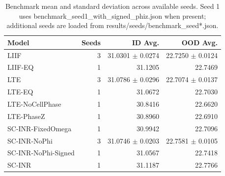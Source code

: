 \begin{table}[t]
\centering
\caption{Benchmark mean and standard deviation across available seeds. Seed 1 uses benchmark_seed1_with_signed_phiz.json when present; additional seeds are loaded from results/seeds/benchmark_seed*.json.}
\label{tab:benchmark_seed_mean_std}
\begin{tabular}{lrrr}
\toprule
Model & Seeds & ID Avg. & OOD Avg. \\
\midrule
LIIF & 3 & 31.0301 $\pm$ 0.0274 & 22.7250 $\pm$ 0.0124 \\
LIIF-EQ & 1 & 31.1205 & 22.7469 \\
LTE & 3 & 31.0786 $\pm$ 0.0296 & 22.7074 $\pm$ 0.0137 \\
LTE-EQ & 1 & 31.0672 & 22.7030 \\
LTE-NoCellPhase & 1 & 30.8416 & 22.6620 \\
LTE-PhaseZ & 1 & 30.8960 & 22.6910 \\
SC-INR-FixedOmega & 1 & 30.9942 & 22.7096 \\
SC-INR-NoPhi & 3 & 31.0746 $\pm$ 0.0203 & 22.7581 $\pm$ 0.0105 \\
SC-INR-NoPhi-Signed & 1 & 31.0567 & 22.7418 \\
SC-INR & 1 & 31.1187 & 22.7766 \\
\bottomrule
\end{tabular}
\end{table}
